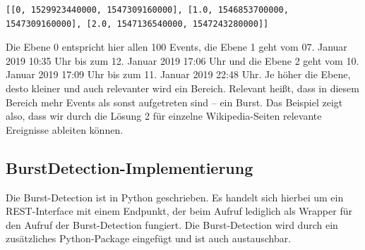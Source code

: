\begin{lstlisting}[label=Solution2_Layers,caption=Ebene 0\, 1 und 2 der Burst-Detectionen,language=epl,firstnumber=1,captionpos=b]
[[0, 1529923440000, 1547309160000], [1.0, 1546853700000, 1547309160000], [2.0, 1547136540000, 1547243280000]]
\end{lstlisting}

Die Ebene 0 entspricht hier allen 100 Events, die Ebene 1 geht vom 07. Januar 2019 10:35 Uhr bis zum 12. Januar 2019 17:06 Uhr und die
Ebene 2 geht vom 10. Januar 2019 17:09 Uhr bis zum 11. Januar 2019 22:48 Uhr. Je höher die Ebene, desto kleiner und auch
relevanter wird ein Bereich. Relevant heißt, dass in diesem Bereich mehr Events als sonst aufgetreten sind -- ein Burst.
Das Beispiel zeigt also, dass wir durch die Lösung 2 für einzelne Wikipedia-Seiten relevante Ereignisse ableiten können.

\subsection{BurstDetection-Implementierung}
Die Burst-Detection ist in Python geschrieben. Es handelt sich hierbei um ein REST-Interface mit einem Endpunkt,
der beim Aufruf lediglich als Wrapper für den Aufruf der Burst-Detection fungiert. Die Burst-Detection wird durch ein
zusätzliches Python-Package eingefügt und ist auch austauschbar.